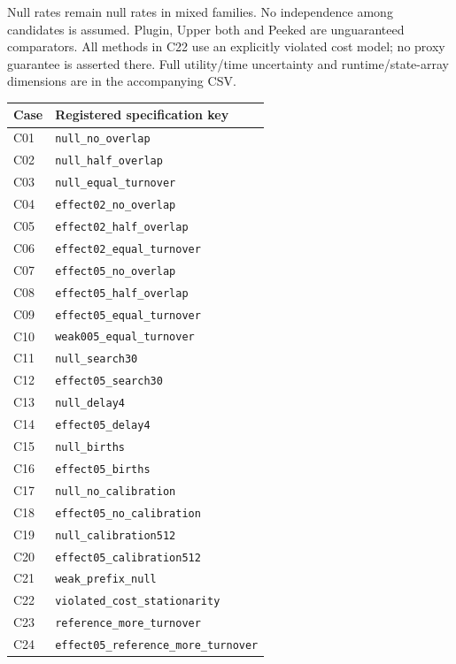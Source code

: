 \noindent Null rates remain null rates in mixed families. No independence among candidates is assumed. Plugin, Upper both and Peeked are unguaranteed comparators. All methods in C22 use an explicitly violated cost model; no proxy guarantee is asserted there. Full utility/time uncertainty and runtime/state-array dimensions are in the accompanying CSV.\endgroup

\begin{longtable}{lp{}}\toprule Case & Registered specification key\\\midrule
C01 & \texttt{null\_no\_overlap}\\
C02 & \texttt{null\_half\_overlap}\\
C03 & \texttt{null\_equal\_turnover}\\
C04 & \texttt{effect02\_no\_overlap}\\
C05 & \texttt{effect02\_half\_overlap}\\
C06 & \texttt{effect02\_equal\_turnover}\\
C07 & \texttt{effect05\_no\_overlap}\\
C08 & \texttt{effect05\_half\_overlap}\\
C09 & \texttt{effect05\_equal\_turnover}\\
C10 & \texttt{weak005\_equal\_turnover}\\
C11 & \texttt{null\_search30}\\
C12 & \texttt{effect05\_search30}\\
C13 & \texttt{null\_delay4}\\
C14 & \texttt{effect05\_delay4}\\
C15 & \texttt{null\_births}\\
C16 & \texttt{effect05\_births}\\
C17 & \texttt{null\_no\_calibration}\\
C18 & \texttt{effect05\_no\_calibration}\\
C19 & \texttt{null\_calibration512}\\
C20 & \texttt{effect05\_calibration512}\\
C21 & \texttt{weak\_prefix\_null}\\
C22 & \texttt{violated\_cost\_stationarity}\\
C23 & \texttt{reference\_more\_turnover}\\
C24 & \texttt{effect05\_reference\_more\_turnover}\\
\bottomrule\end{longtable}
